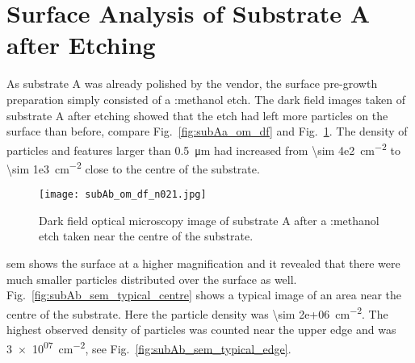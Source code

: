 \clearpage
%
%
    
\section{Surface Analysis of Substrate A after Etching}
As substrate A was already polished by the vendor, the surface pre-growth preparation simply consisted of a :methanol etch. The dark field images taken of substrate A after etching showed that the etch had left more particles on the surface than before, compare Fig.~\ref{fig:subAa_om_df} and Fig.~\ref{fig:subAb_om_df}. The density of particles and features larger than \SI{0.5}{\micro\metre} had increased from \SI{\sim 4e2}{\centi\metre^{-2}} to \SI{\sim 1e3}{\centi\metre^{-2}} close to the centre of the substrate. %

\begin{figure}[htbp]
    \centering
    \texttt{[image: subAb\_om\_df\_n021.jpg]}
    \caption[Dark field optical microscopy image of substrate A after a :methanol etch.]{Dark field optical microscopy image of substrate A after a :methanol etch taken near the centre of the substrate.}\label{fig:subAb_om_df}
\end{figure}

\Ac{sem} shows the surface at a higher magnification and it revealed that there were much smaller particles distributed over the surface as well. Fig.~\ref{fig:subAb_sem_typical_centre} shows a typical image of an area near the centre of the substrate. Here the particle density was  \SI{\sim 2e+06}{\centi\metre^{-2}}. The highest observed density of particles was counted near the upper edge and was \SI{3e+07}{\centi\metre^{-2}}, see Fig.~\ref{fig:subAb_sem_typical_edge}.

